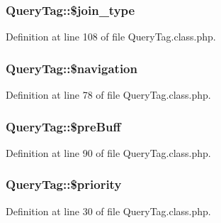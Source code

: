 \hypertarget{classQueryTag_a8ab11b51470b725b766e2d53bb947ba4}{}
\subsubsection[{\$join\+\_\+type}]{\setlength{\rightskip}{0pt plus 5cm}Query\+Tag\+::\$join\+\_\+type}\label{classQueryTag_a8ab11b51470b725b766e2d53bb947ba4}


Definition at line 108 of file Query\+Tag.\+class.\+php.

\hypertarget{classQueryTag_a60f53db40ea035c8e9c88ab2681e3792}{}
\subsubsection[{\$navigation}]{\setlength{\rightskip}{0pt plus 5cm}Query\+Tag\+::\$navigation}\label{classQueryTag_a60f53db40ea035c8e9c88ab2681e3792}


Definition at line 78 of file Query\+Tag.\+class.\+php.

\hypertarget{classQueryTag_ac51df39445e0b132d1fa388c01ebf56d}{}
\subsubsection[{\$pre\+Buff}]{\setlength{\rightskip}{0pt plus 5cm}Query\+Tag\+::\$pre\+Buff}\label{classQueryTag_ac51df39445e0b132d1fa388c01ebf56d}


Definition at line 90 of file Query\+Tag.\+class.\+php.

\hypertarget{classQueryTag_ac09e6c0124ba1d5945c7f93232e13827}{}
\subsubsection[{\$priority}]{\setlength{\rightskip}{0pt plus 5cm}Query\+Tag\+::\$priority}\label{classQueryTag_ac09e6c0124ba1d5945c7f93232e13827}


Definition at line 30 of file Query\+Tag.\+class.\+php.

\hypertarget{classQueryTag_a40fbf27ebaa31f5430080152164c3bae}{}
